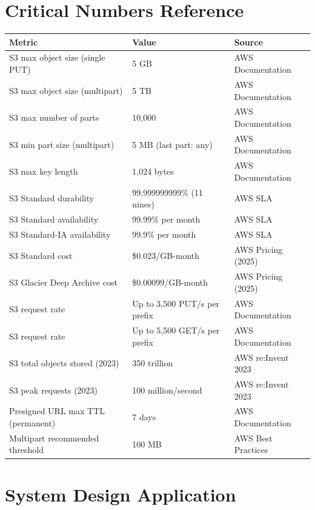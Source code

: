 \documentclass[11pt,a4paper]{article}
\begin{document}
\section{Critical Numbers Reference}

\begin{center}
\renewcommand{\arraystretch}{1.5}
\begin{tabular}{p{5.5cm}p{4cm}p{4cm}}
\toprule
\textbf{Metric} & \textbf{Value} & \textbf{Source} \\
\midrule
S3 max object size (single PUT) & 5 GB & AWS Documentation \\
S3 max object size (multipart) & 5 TB & AWS Documentation \\
S3 max number of parts & 10,000 & AWS Documentation \\
S3 min part size (multipart) & 5 MB (last part: any) & AWS Documentation \\
S3 max key length & 1,024 bytes & AWS Documentation \\
S3 Standard durability & 99.999999999\% (11 nines) & AWS SLA \\
S3 Standard availability & 99.99\% per month & AWS SLA \\
S3 Standard-IA availability & 99.9\% per month & AWS SLA \\
S3 Standard cost & \$0.023/GB-month & AWS Pricing (2025) \\
S3 Glacier Deep Archive cost & \$0.00099/GB-month & AWS Pricing (2025) \\
S3 request rate & Up to 3,500 PUT/s per prefix & AWS Documentation \\
S3 request rate & Up to 5,500 GET/s per prefix & AWS Documentation \\
S3 total objects stored (2023) & 350 trillion & AWS re:Invent 2023 \\
S3 peak requests (2023) & 100 million/second & AWS re:Invent 2023 \\
Presigned URL max TTL (permanent) & 7 days & AWS Documentation \\
Multipart recommended threshold & 100 MB & AWS Best Practices \\
\bottomrule
\end{tabular}
\end{center}

\section{System Design Application}
\end{document}

